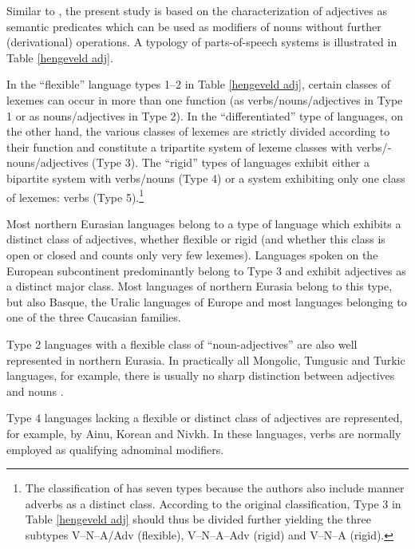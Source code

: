 Similar to \textcite{hengeveld-etal2004}, the present study is based on the characterization of adjectives as semantic predicates which can be used as modifiers of nouns without further (derivational) operations. A typology of parts-of-speech systems is illustrated in Table \ref{hengeveld adj}.

In the “flexible” language types 1–2 in Table \ref{hengeveld adj}, certain classes of lexemes can occur in more than one function (as verbs/nouns/adjectives in Type 1 or as nouns/adjectives in Type 2). In the “differentiated” type of languages, on the other hand, the various classes of lexemes are strictly divided according to their function and constitute a tripartite system of lexeme classes with verbs\fshyp{}nouns\fshyp{}adjectives (Type 3). The “rigid” types of languages exhibit either a bipartite system with verbs/nouns (Type 4) or a system exhibiting only one class of lexemes: verbs (Type 5).\footnote{The classification of \textcite{hengeveld-etal2004} has seven types because the authors also include manner adverbs as a distinct class. According to the original classification, Type 3 in Table \ref{hengeveld adj} should thus be divided further yielding the three subtypes V–N–A/Adv (flexible), V–N–A–Adv (rigid) and V–N–A (rigid).} 

Most northern Eurasian languages belong to a type of language which exhibits a distinct class of adjectives, whether flexible or rigid (and whether this class is open or closed and counts only very few lexemes). Languages spoken on the European subcontinent predominantly belong to Type 3 and exhibit adjectives as a distinct major class. Most  languages of northern Eurasia belong to this type, but also Basque, the Uralic languages of Europe and most languages belonging to one of the three Caucasian families.

Type 2 languages with a flexible class of “noun-adjectives” are also well represented in northern Eurasia. In practically all Mongolic, Tungusic and Turkic languages, for example, there is usually no sharp distinction between adjectives and nouns \parencites[122–123]{rijkhoff2002}[9]{poppe1964}.

Type 4 languages lacking a flexible or distinct class of adjectives are represented, for example, by Ainu, Korean and Nivkh. In these languages, verbs are normally employed as qualifying adnominal modifiers.

